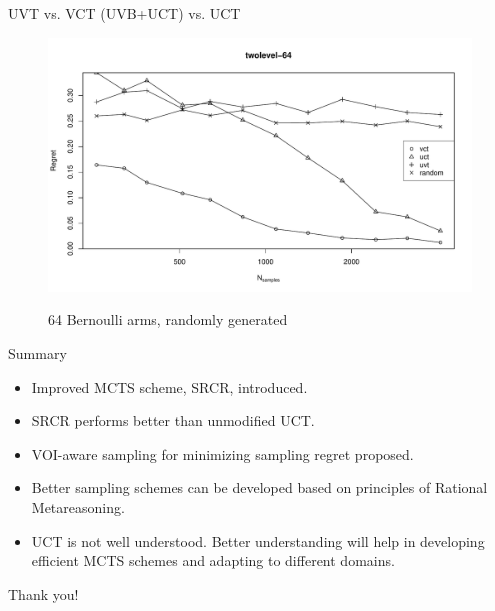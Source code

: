 \documentclass{beamer}
\begin{document}
\begin{frame}{UVT vs. VCT (UVB+UCT) vs. UCT}
\begin{figure}[h]
\centering
\includegraphics[scale=0.45]{twolevel-64.pdf}

64 Bernoulli arms, randomly generated
\end{figure}
\end{frame}

\begin{frame}{Summary}
\begin{itemize}
\item<+-> Improved MCTS scheme, SRCR, introduced.
\item<+-> SRCR performs better than unmodified UCT.
\item<+-> VOI-aware sampling for minimizing sampling regret proposed.
\item<+-> Better sampling schemes can be developed based on principles
  of Rational Metareasoning.
\item<+-> UCT is not well understood. Better understanding will help
  in developing efficient  MCTS schemes and adapting to different domains.
\end{itemize}
\end{frame}

\begin{frame}{}
\begin{center}
\LARGE{Thank you!}
\end{center}
\end{frame}
\end{document}

